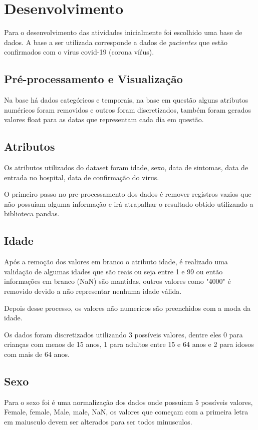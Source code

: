 \chapter{Desenvolvimento}\label{cap_desenv}

Para o desenvolvimento das atividades inicialmente foi escolhido uma base de dados. A base a ser utilizada corresponde a dados de \textit{pacientes} que estão confirmados com o vírus covid-19 (corona víŕus).

\section{Pré-processamento e Visualização}
Na base há dados categóricos e temporais, na base em questão alguns atributos numéricos foram removidos e outros foram discretizados, também foram gerados valores float para as datas que representam cada dia em questão.

\section{Atributos}

Os atributos utilizados do dataset foram idade, sexo, data de sintomas, data de entrada no hospital, data de confirmação do virus.

O primeiro passo no pre-processamento dos dados é remover registros vazios que não possuiam alguma informação e irá atrapalhar o resultado obtido utilizando a biblioteca pandas.

\section{Idade}
Após a remoção dos valores em branco o atributo idade, é realizado uma validação de algumas idades que são reais ou seja entre 1 e 99 ou então informações em branco (NaN) são mantidas, outros valores como "4000" é removido devido a não representar nenhuma idade válida.

Depois desse processo, os valores não numericos são preenchidos com a moda da idade.

Os dados foram discretizados utilizando 3 possíveis valores, dentre eles 0 para crianças com menos de 15 anos, 1 para adultos entre 15 e 64 anos e 2 para idosos com mais de 64 anos.

\section{Sexo}
Para o sexo foi é uma normalização dos dados onde possuiam 5 possíveis valores, Female, female, Male, male, NaN, os valores que começam com a primeira letra em maiusculo devem ser alterados para ser todos minusculos.

